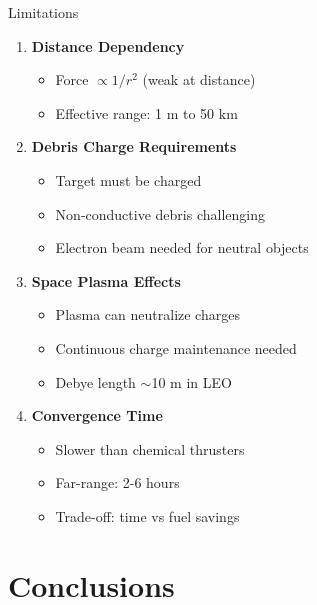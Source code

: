 \documentclass[aspectratio=169]{beamer}
\begin{document}
\begin{frame}{Limitations}
\begin{enumerate}
    \item \textbf{Distance Dependency}
    \begin{itemize}
        \item Force $\propto 1/r^2$ (weak at distance)
        \item Effective range: 1 m to 50 km
    \end{itemize}

    \item \textbf{Debris Charge Requirements}
    \begin{itemize}
        \item Target must be charged
        \item Non-conductive debris challenging
        \item Electron beam needed for neutral objects
    \end{itemize}

    \item \textbf{Space Plasma Effects}
    \begin{itemize}
        \item Plasma can neutralize charges
        \item Continuous charge maintenance needed
        \item Debye length $\sim$10 m in LEO
    \end{itemize}

    \item \textbf{Convergence Time}
    \begin{itemize}
        \item Slower than chemical thrusters
        \item Far-range: 2-6 hours
        \item Trade-off: time vs fuel savings
    \end{itemize}
\end{enumerate}
\end{frame}

\section{Conclusions}
\end{document}
